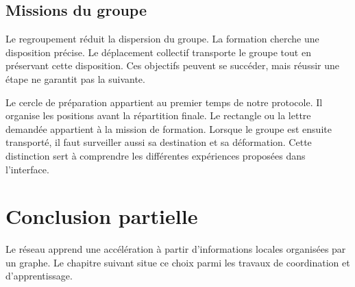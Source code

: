 \subsection{Missions du groupe}
Le regroupement réduit la dispersion du groupe. La formation cherche une disposition précise. Le déplacement collectif transporte le groupe tout en préservant cette disposition. Ces objectifs peuvent se succéder, mais réussir une étape ne garantit pas la suivante.

Le cercle de préparation appartient au premier temps de notre protocole. Il organise les positions avant la répartition finale. Le rectangle ou la lettre demandée appartient à la mission de formation. Lorsque le groupe est ensuite transporté, il faut surveiller aussi sa destination et sa déformation. Cette distinction sert à comprendre les différentes expériences proposées dans l'interface.

\section{Conclusion partielle}
Le réseau apprend une accélération à partir d'informations locales organisées par un graphe. Le chapitre suivant situe ce choix parmi les travaux de coordination et d'apprentissage.
